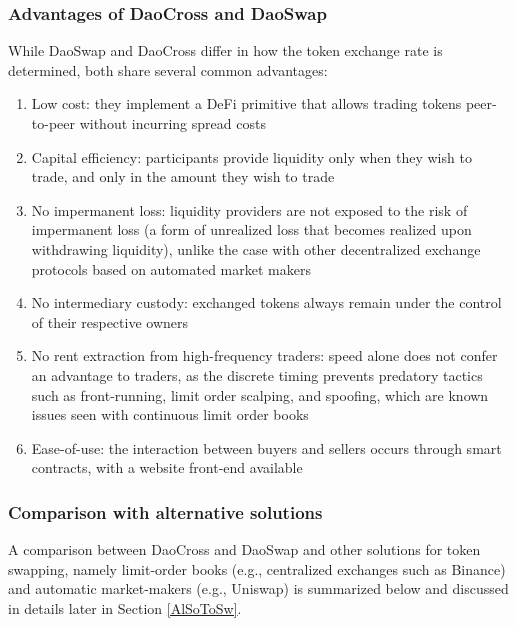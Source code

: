 \documentclass[11pt, reqno]{amsart}
\theoremstyle{definition}
\theoremstyle{remark}
\begin{document}
\subsubsection{Advantages of DaoCross and DaoSwap}
While DaoSwap and DaoCross differ in how the token exchange rate is determined,
both share several common advantages:
\begin{enumerate}
	\item Low cost:
	      they implement a DeFi primitive that allows trading tokens
          peer-to-peer without incurring spread costs
	\item Capital efficiency:
	      participants provide liquidity only when
	      they wish to trade, and only in the amount they wish to trade
	\item No impermanent loss:
	      liquidity providers are not exposed to the risk of impermanent loss
	      (a form of unrealized loss that becomes realized upon withdrawing
	      liquidity), unlike the case with other decentralized exchange protocols
	      based on automated market makers
	\item No intermediary custody:
	      exchanged tokens always remain under the control of their respective
	      owners
	\item No rent extraction from high-frequency traders:
	      speed alone does not confer an advantage to traders, as the discrete
	      timing prevents predatory tactics such as front-running, limit order
	      scalping, and spoofing, which are known issues seen with continuous
	      limit order books
	\item Ease-of-use: the interaction between buyers and sellers occurs
	      through smart contracts, with a website front-end available
\end{enumerate}

\subsubsection{Comparison with alternative solutions}
A comparison between DaoCross and DaoSwap and other solutions for token
swapping, namely limit-order books (e.g., centralized exchanges such as
Binance) and automatic market-makers (e.g., Uniswap) is summarized below
and discussed in details later in Section \ref{AlSoToSw}.
\end{document}
